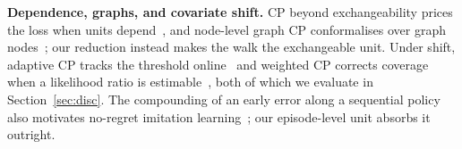 \textbf{Dependence, graphs, and covariate shift.}
CP beyond exchangeability prices the loss when units
depend~\cite{barber2023beyond}, and node-level graph CP conformalises over
graph nodes~\cite{huang2023graphcp,zargarbashi2023graphcp}; our reduction
instead makes the walk the exchangeable unit. Under shift, adaptive CP tracks
the threshold online~\cite{gibbs2021aci} and weighted CP corrects coverage
when a likelihood ratio is estimable~\cite{tibshirani2019covariateshift},
both of which we evaluate in Section~\ref{sec:disc}. The compounding of an
early error along a sequential policy also motivates no-regret imitation
learning~\cite{ross2011reduction}; our episode-level unit absorbs it
outright.
